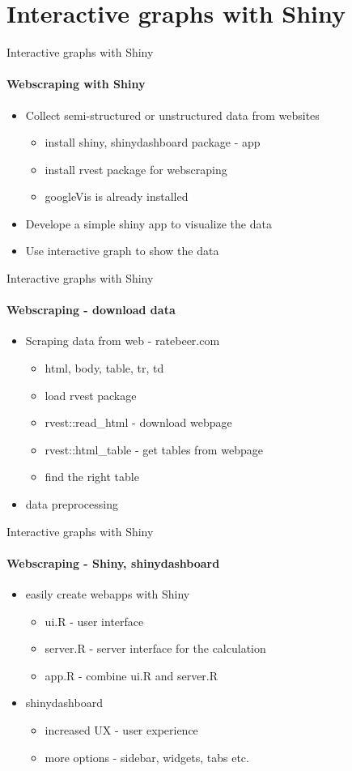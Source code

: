 \documentclass[10pt]{beamer}
\begin{document}
\section{Interactive graphs with Shiny}

\begin{frame}{Interactive graphs with Shiny}
\framesubtitle{Webscraping with Shiny}
\begin{itemize}
\item Collect semi-structured or unstructured data from websites
\begin{itemize}
\item install shiny, shinydashboard package - app
\item install rvest package for webscraping
\item googleVis is already installed
\end{itemize}
\item Develope a simple shiny app to visualize the data
\item Use interactive graph to show the data
\end{itemize}
\end{frame}

\begin{frame}{Interactive graphs with Shiny}
\framesubtitle{Webscraping - download data}
\begin{itemize}
\item Scraping data from web - ratebeer.com
\begin{itemize}
\item html, body, table, tr, td
\item load rvest package
\item rvest::read\_html - download webpage
\item rvest::html\_table - get tables from webpage
\item find the right table
\end{itemize}
\item data preprocessing
\end{itemize}
\end{frame}

\begin{frame}{Interactive graphs with Shiny}
\framesubtitle{Webscraping - Shiny, shinydashboard}
\begin{itemize}
\item easily create webapps with Shiny
\begin{itemize}
\item ui.R - user interface
\item server.R - server interface for the calculation
\item app.R - combine ui.R and server.R
\end{itemize}
\item shinydashboard
\begin{itemize}
\item increased UX - user experience
\item more options - sidebar, widgets, tabs etc.
\end{itemize}
\end{itemize}
\end{frame}
\end{document}
